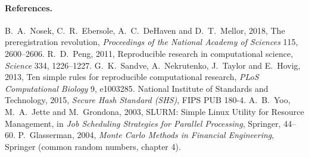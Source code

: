 \paragraph{References.}
\begingroup\sloppy
B.~A.~Nosek, C.~R.~Ebersole, A.~C.~DeHaven and D.~T.~Mellor, 2018, The preregistration revolution, \emph{Proceedings of the National Academy of Sciences} 115, 2600--2606.
R.~D.~Peng, 2011, Reproducible research in computational science, \emph{Science} 334, 1226--1227.
G.~K.~Sandve, A.~Nekrutenko, J.~Taylor and E.~Hovig, 2013, Ten simple rules for reproducible computational research, \emph{PLoS Computational Biology} 9, e1003285.
National Institute of Standards and Technology, 2015, \emph{Secure Hash Standard (SHS)}, FIPS PUB 180-4.
A.~B.~Yoo, M.~A.~Jette and M.~Grondona, 2003, SLURM: Simple Linux Utility for Resource Management, in \emph{Job Scheduling Strategies for Parallel Processing}, Springer, 44--60.
P.~Glasserman, 2004, \emph{Monte Carlo Methods in Financial Engineering}, Springer (common random numbers, chapter 4).\par\endgroup
